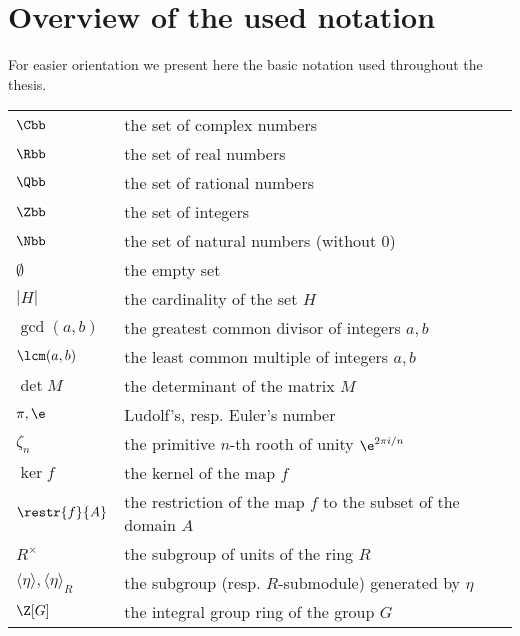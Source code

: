 \chapter*{Overview of the used notation}

For easier orientation we present here the basic notation used throughout the thesis.
\begin{flushleft}
\begin{longtable}[l]{ll} %
  $\Cbb$                 & the set of complex numbers \\[1mm]
  $\Rbb$                 & the set of real numbers \\[1mm]
  $\Qbb$                 & the set of rational numbers \\[1mm]
  $\Zbb$                 & the set of integers \\[1mm]
  $\Nbb$                 & the set of natural numbers (without $0$)\\[1mm]
  $\emptyset$                 & the empty set\\[1mm]
  $|H|$						& the cardinality of the set $H$  \\[1mm]
  $\gcd(a,b)$			& the greatest common divisor of integers $a,b$ \\[1mm]
  $\lcm(a,b)$			& the least common multiple of integers $a,b$ \\[1mm]
  $\det M$			& the determinant of the matrix $M$ \\[1mm]
  $\pi,\e$					  & Ludolf's, resp. Euler's number \\[1mm]
  $\zeta_n$                 & the primitive $n$-th rooth of unity $\e^{2\pi i/n}$ \\[1mm]
  $\ker f$                 & the kernel of the map $f$ \\[1mm]
  $\restr{f}{A}$		& the restriction of the map $f$ to the subset of the domain $A$ \\[1mm]
  $R^{\times}$		& the subgroup of units of the ring $R$ \\[1mm]
  $\langle \eta \rangle, \langle \eta \rangle_{R}$ & the subgroup (resp. $R$-submodule) generated by $\eta$ \\[1mm]
  $\Z[G]$					& the integral group ring of the group $G$ \\[1mm]

\end{longtable}
\end{flushleft}
